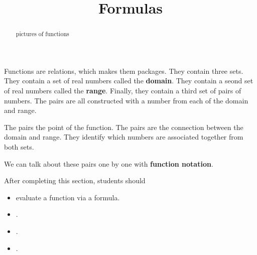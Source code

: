 \documentclass{ximera}
\title{Formulas}
\begin{document}
\begin{abstract}
pictures of functions
\end{abstract}
\maketitle


Functions are relations, which makes them packages.  They contain three sets.  They contain a set of real numbers called the \textbf{domain}.  They contain a seond set of real numbers called the \textbf{range}. Finally, they contain a third set of pairs of numbers.  The pairs are all constructed with a number from each of the domain and range.

The pairs the point of the function.  The pairs are the connection between the domain and range.  They identify which numbers are associated together from both sets.

We can talk about these pairs one by one with \textbf{function notation}.




































\begin{sectionOutcomes}
After completing this section, students should 

\begin{itemize}
\item evaluate a function via a formula.
\item .
\item .
\item .
\end{itemize}
\end{sectionOutcomes}
\end{document}
